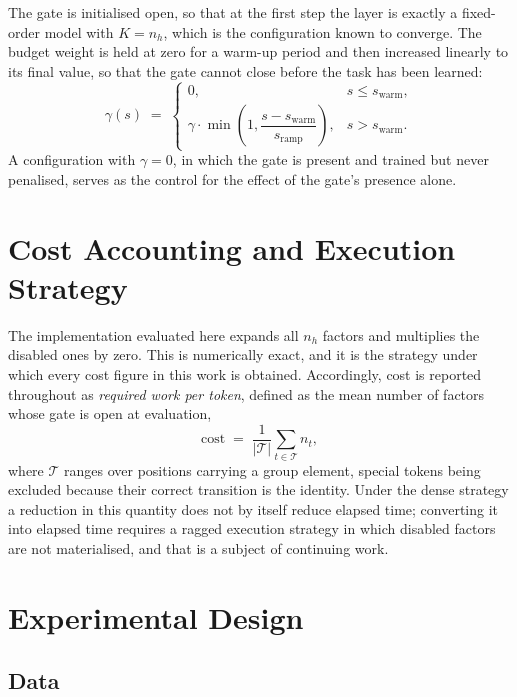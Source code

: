 The gate is initialised open, so that at the first step the layer is exactly a
fixed-order model with $K = n_h$, which is the configuration known to converge.
The budget weight is held at zero for a warm-up period and then increased
linearly to its final value, so that the gate cannot close before the task has
been learned:
\begin{equation}
\gamma(s) \;=\;
\begin{cases}
0, & s \le s_{\text{warm}},\\[2pt]
\gamma \cdot \min\!\left(1, \dfrac{s - s_{\text{warm}}}{s_{\text{ramp}}}\right), & s > s_{\text{warm}} .
\end{cases}
\end{equation}
A configuration with $\gamma = 0$, in which the gate is present and trained but
never penalised, serves as the control for the effect of the gate's presence
alone.

\section{Cost Accounting and Execution Strategy}

The implementation evaluated here expands all $n_h$ factors and multiplies the
disabled ones by zero. This is numerically exact, and it is the strategy under
which every cost figure in this work is obtained. Accordingly, cost is reported
throughout as \emph{required work per token}, defined as the mean number of
factors whose gate is open at evaluation,
\begin{equation}
\text{cost} \;=\; \frac{1}{|\mathcal{T}|}\sum_{t \in \mathcal{T}} n_t ,
\end{equation}
where $\mathcal{T}$ ranges over positions carrying a group element, special
tokens being excluded because their correct transition is the identity. Under the
dense strategy a reduction in this quantity does not by itself reduce elapsed
time; converting it into elapsed time requires a ragged execution strategy in
which disabled factors are not materialised, and that is a subject of continuing
work.

\section{Experimental Design}
\label{sec:design}

\subsection{Data}

